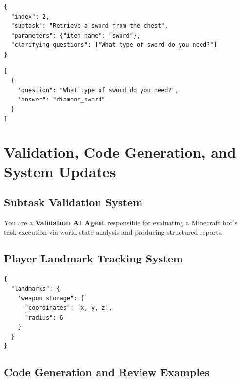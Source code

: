 \begin{lstlisting}[style=json,caption={Example task requiring clarification.}]
{
  "index": 2,
  "subtask": "Retrieve a sword from the chest",
  "parameters": {"item_name": "sword"},
  "clarifying_questions": ["What type of sword do you need?"]
}
\end{lstlisting}

\begin{lstlisting}[style=json,caption={Clarification response example.}]
[
  {
    "question": "What type of sword do you need?",
    "answer": "diamond_sword"
  }
]
\end{lstlisting}

\section{Validation, Code Generation, and System Updates}
\label{app:validation}

\vspace{10pt}

\subsection{Subtask Validation System}

\begin{tcolorbox}[title=System Prompt: Subtask Validator]
You are a \textbf{Validation AI Agent} responsible for evaluating a Minecraft bot's task execution via world-state analysis and producing structured reports.
\end{tcolorbox}

\subsection{Player Landmark Tracking System}

\begin{lstlisting}[style=json,caption={Landmark update schema.}]
{
  "landmarks": {
    "weapon storage": {
      "coordinates": [x, y, z],
      "radius": 6
    }
  }
}
\end{lstlisting}

\subsection{Code Generation and Review Examples}

